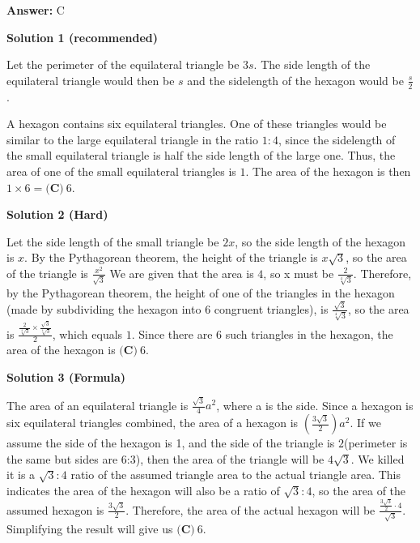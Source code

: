 \begin{enumerate}
 \textbf{Answer: }C



\textbf{Solution 1 (recommended)}

Let the perimeter of the equilateral triangle be $3s$. The side length of the equilateral triangle would then be $s$ and the sidelength of the hexagon would be $\frac{s}{2}$.

 A hexagon contains six equilateral triangles. One of these triangles would be similar to the large equilateral triangle in the ratio $1 : 4$, since the sidelength of the small equilateral triangle is half the side length of the large one. Thus, the area of one of the small equilateral triangles is $1$. The area of the hexagon is then $1 \times 6 = \boxed{\textbf{(C)}\ 6}$.

 



\textbf{Solution 2 (Hard)}

Let the side length of the small triangle be $2x$, so the side length of the hexagon is $x$. By the Pythagorean theorem, the height of the triangle is $x\sqrt{3}$, so the area of the triangle is $\frac{x^2}{\sqrt{3}}$ We are given that the area is $4$, so x must be $\frac{2}{\sqrt[4]{3}}$. Therefore, by the Pythagorean theorem, the height of one of the triangles in the hexagon (made by subdividing the hexagon into $6$ congruent triangles), is $\frac{\sqrt{3}}{\sqrt[4]{3}}$, so the area is $\frac{\frac{2}{\sqrt[4]{3}}\times\frac{\sqrt{3}}{\sqrt[4]{3}}}{2}$, which equals $1$. Since there are $6$ such triangles in the hexagon, the area of the hexagon is $\boxed{\textbf{(C)}\ 6}$.

 



\textbf{Solution 3 (Formula)}

The area of an equilateral triangle is $\frac{\sqrt{3}}{4} a^2$, where a is the side. Since a hexagon is six equilateral triangles combined, the area of a hexagon is $\left(\frac{3\sqrt{3}}{2}\right) a^2$. If we assume the side of the hexagon is 1, and the side of the triangle is $2$(perimeter is the same but sides are 6:3), then the area of the triangle will be $4\sqrt{3}$. We killed it is a $\sqrt{3} : 4$ ratio of the assumed triangle area to the actual triangle area. This indicates the area of the hexagon will also be a ratio of $\sqrt{3} : 4$, so the area of the assumed hexagon is $\frac{3\sqrt{3}}{2}$. Therefore, the area of the actual hexagon will be $\frac{\frac{3\sqrt{3}}{2} \cdot 4}{\sqrt{3}}$. Simplifying the result will give us $\boxed{\textbf{(C)}\ 6}$.


\end{enumerate}
